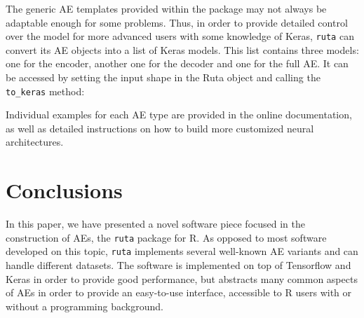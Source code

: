 {The generic AE templates provided within the package may not always be adaptable enough for some problems. Thus, in order to provide detailed control over the model for more advanced users with some knowledge of Keras, \texttt{ruta} can convert its AE objects into a list of Keras models. This list contains three models: one for the encoder, another one for the decoder and one for the full AE. It can be accessed by setting the input shape in the Ruta object and calling the \texttt{to\_keras} method:}



Individual examples for each AE type are provided in the online documentation, as well as detailed instructions on how to build more customized neural architectures.

%




\section{Conclusions}
\label{p2sec.conclusions}


In this paper, we have presented a novel software piece focused in the construction of AEs, the \texttt{ruta} package for R. As opposed to most software developed on this topic, \texttt{ruta} implements several well-known AE variants and can handle different datasets. The software is implemented on top of Tensorflow and Keras in order to provide good performance{, but abstracts many common aspects of AEs in order to provide an easy-to-use interface, accessible to R users with or without a programming background}.

